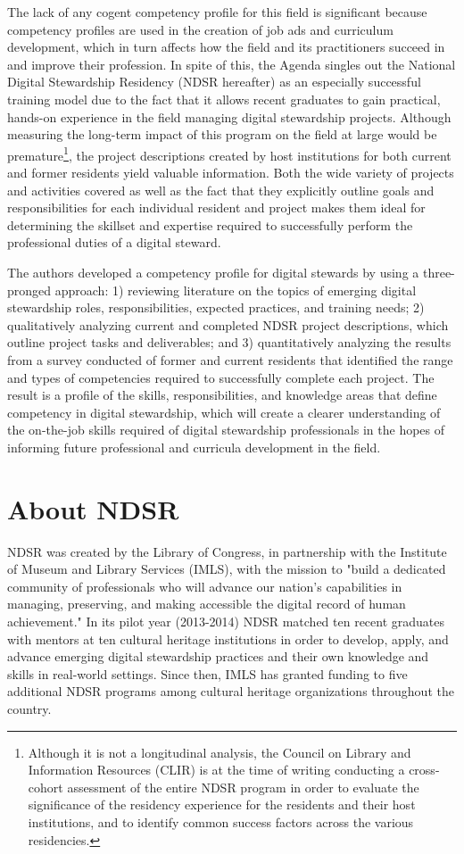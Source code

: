 \documentclass{acm_proc_article-sp}
\begin{document}
The lack of any cogent competency profile for this field is significant because competency profiles are used in the creation of job ads and curriculum development, which in turn affects how the field and its practitioners succeed in and improve their profession. In spite of this, the Agenda singles out the National Digital Stewardship Residency (NDSR hereafter) as an especially successful training model due to the fact that it allows recent graduates to gain practical, hands-on experience in the field managing digital stewardship projects. Although measuring the long-term impact of this program on the field at large would be premature\footnote{Although it is not a longitudinal analysis, the Council on Library and Information Resources (CLIR) is at the time of writing conducting a cross-cohort assessment of the entire NDSR program in order to evaluate the significance of the residency experience for the residents and their host institutions, and to identify common success factors across the various residencies.\cite{2}}, the project descriptions created by host institutions for both current and former residents yield valuable information. Both the wide variety of projects and activities covered as well as the fact that they explicitly outline goals and responsibilities for each individual resident and project makes them ideal for determining the skillset and expertise required to successfully perform the professional duties of a digital steward. 

The authors developed a competency profile for digital stewards by using a three-pronged approach: 1) reviewing literature on the topics of emerging digital stewardship roles, responsibilities, expected practices, and training needs; 2) qualitatively analyzing current and completed NDSR project descriptions, which outline project tasks and deliverables; and 3) quantitatively analyzing the results from a survey conducted of former and current residents that identified the range and types of competencies required to successfully complete each project. The result is a profile of the skills, responsibilities, and knowledge areas that define competency in digital stewardship, which will create a clearer understanding of the on-the-job skills required of digital stewardship professionals in the hopes of informing future professional and curricula development in the field.

\section{About NDSR}
NDSR was created by the Library of Congress, in partnership with the Institute of Museum and Library Services (IMLS), with the mission to "build a dedicated community of professionals who will advance our nation's capabilities in managing, preserving, and making accessible the digital record of human achievement."\cite{3} In its pilot year (2013-2014) NDSR matched ten recent graduates with mentors at ten cultural heritage institutions in order to develop, apply, and advance emerging digital stewardship practices and their own knowledge and skills in real-world settings. Since then, IMLS has granted funding to five additional NDSR programs among cultural heritage organizations throughout the country.
\end{document}
